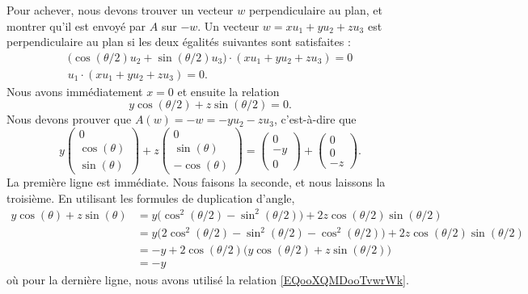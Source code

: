 \begin{subproof}
	Pour achever, nous devons trouver un vecteur \( w\) perpendiculaire au plan, et montrer qu'il est envoyé par \( A\) sur \( -w\). Un vecteur \( w=xu_1+yu_2+zu_3\) est perpendiculaire au plan si les deux égalités suivantes sont satisfaites :
	\begin{subequations}
		\begin{align}
			\big( \cos(\theta/2)u_2+\sin(\theta/2)u_3 \big)\cdot (xu_1+yu_2+zu_3)=0 \\
			u_1\cdot(xu_1+yu_2+zu_3)=0.
		\end{align}
	\end{subequations}
	Nous avons immédiatement \( x=0\) et ensuite la relation
	\begin{equation}        \label{EQooXQMDooTvwrWk}
		y\cos(\theta/2)+z\sin(\theta/2)=0.
	\end{equation}
	Nous devons prouver que \( A(w)=-w=-yu_2-zu_3\), c'est-à-dire que
	\begin{equation}
		y\begin{pmatrix}
			0            \\
			\cos(\theta) \\
			\sin(\theta)
		\end{pmatrix}
		+z\begin{pmatrix}
			0            \\
			\sin(\theta) \\
			-\cos(\theta)
		\end{pmatrix}
		=\begin{pmatrix}
			0  \\
			-y \\
			0
		\end{pmatrix}+\begin{pmatrix}
			0 \\
			0 \\
			-z
		\end{pmatrix}.
	\end{equation}
	La première ligne est immédiate. Nous faisons la seconde, et nous laissons  la troisième. En utilisant les formules de duplication d'angle,
	\begin{subequations}
		\begin{align}
			y\cos(\theta)+z\sin(\theta) & =y\big( \cos^2(\theta/2)-\sin^2(\theta/2) \big)+2z\cos(\theta/2)\sin(\theta/2)                   \\
			                            & =y\big( 2\cos^2(\theta/2)-\sin^2(\theta/2)-\cos^2(\theta/2) \big)+2z\cos(\theta/2)\sin(\theta/2) \\
			                            & =-y+2\cos(\theta/2)\big( y\cos(\theta/2)+z\sin(\theta/2) \big)                                   \\
			                            & =-y
		\end{align}
	\end{subequations}
	où pour la dernière ligne, nous avons utilisé la relation \eqref{EQooXQMDooTvwrWk}.


\end{subproof}
